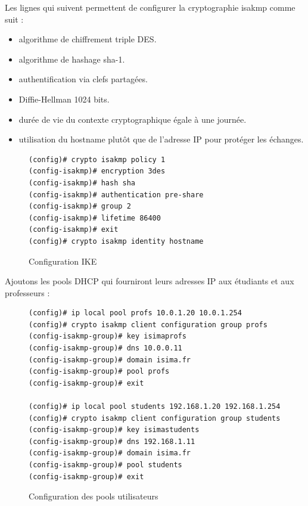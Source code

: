 Les lignes qui suivent permettent de configurer la cryptographie isakmp comme suit :
\begin{itemize}
	\item algorithme de chiffrement triple DES.
	\item algorithme de hashage sha-1.
	\item authentification via clefs partagées.
	\item Diffie-Hellman 1024 bits.
	\item durée de vie du contexte cryptographique égale à une journée.
	\item utilisation du hostname plutôt que de l'adresse IP pour protéger les échanges.
\end{itemize}


\begin{figure}[H]
	\begin{center}
		\begin{minipage}{0.90\textwidth}
			\begin{lstlisting}[frame=trBL]
(config)# crypto isakmp policy 1
(config-isakmp)# encryption 3des
(config-isakmp)# hash sha
(config-isakmp)# authentication pre-share
(config-isakmp)# group 2
(config-isakmp)# lifetime 86400
(config-isakmp)# exit
(config)# crypto isakmp identity hostname
			\end{lstlisting}
		\end{minipage}
	\end{center}
	\caption{Configuration IKE}
	\label{configuration_ike}
\end{figure}

Ajoutons les pools DHCP qui fourniront leurs adresses IP aux étudiants et aux professeurs :
\begin{figure}[H]
	\begin{center}
		\begin{minipage}{0.90\textwidth}
			\begin{lstlisting}[frame=trBL]
(config)# ip local pool profs 10.0.1.20 10.0.1.254
(config)# crypto isakmp client configuration group profs
(config-isakmp-group)# key isimaprofs
(config-isakmp-group)# dns 10.0.0.11
(config-isakmp-group)# domain isima.fr
(config-isakmp-group)# pool profs
(config-isakmp-group)# exit

(config)# ip local pool students 192.168.1.20 192.168.1.254
(config)# crypto isakmp client configuration group students
(config-isakmp-group)# key isimastudents
(config-isakmp-group)# dns 192.168.1.11
(config-isakmp-group)# domain isima.fr
(config-isakmp-group)# pool students
(config-isakmp-group)# exit
			\end{lstlisting}
		\end{minipage}
	\end{center}
	\caption{Configuration des pools utilisateurs}
	\label{configuration_pools_utilisateurs}
\end{figure}



